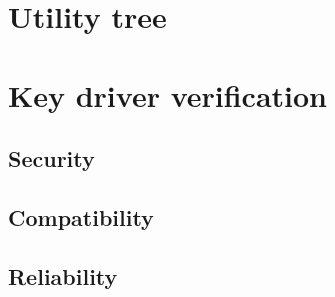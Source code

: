\section{Utility tree}
\section{Key driver verification}
\subsection{Security}
\subsection{Compatibility}
\subsection{Reliability}